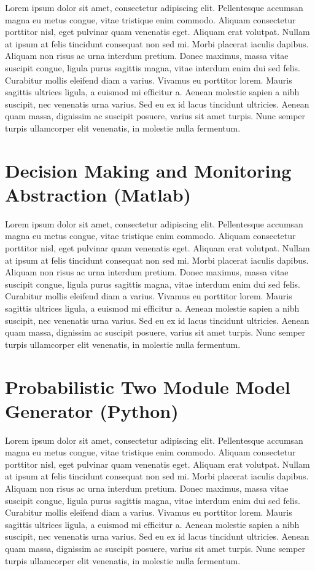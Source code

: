 Lorem ipsum dolor sit amet, consectetur adipiscing elit. Pellentesque accumsan magna eu metus congue, vitae tristique enim commodo. Aliquam consectetur porttitor nisl, eget pulvinar quam venenatis eget. Aliquam erat volutpat. Nullam at ipsum at felis tincidunt consequat non sed mi. Morbi placerat iaculis dapibus. Aliquam non risus ac urna interdum pretium. Donec maximus, massa vitae suscipit congue, ligula purus sagittis magna, vitae interdum enim dui sed felis. Curabitur mollis eleifend diam a varius. Vivamus eu porttitor lorem. Mauris sagittis ultrices ligula, a euismod mi efficitur a. Aenean molestie sapien a nibh suscipit, nec venenatis urna varius. Sed eu ex id lacus tincidunt ultricies. Aenean quam massa, dignissim ac suscipit posuere, varius sit amet turpis. Nunc semper turpis ullamcorper elit venenatis, in molestie nulla fermentum.

\section{Decision Making and Monitoring Abstraction (Matlab)}
\label{sec:dm_abs}

Lorem ipsum dolor sit amet, consectetur adipiscing elit. Pellentesque accumsan magna eu metus congue, vitae tristique enim commodo. Aliquam consectetur porttitor nisl, eget pulvinar quam venenatis eget. Aliquam erat volutpat. Nullam at ipsum at felis tincidunt consequat non sed mi. Morbi placerat iaculis dapibus. Aliquam non risus ac urna interdum pretium. Donec maximus, massa vitae suscipit congue, ligula purus sagittis magna, vitae interdum enim dui sed felis. Curabitur mollis eleifend diam a varius. Vivamus eu porttitor lorem. Mauris sagittis ultrices ligula, a euismod mi efficitur a. Aenean molestie sapien a nibh suscipit, nec venenatis urna varius. Sed eu ex id lacus tincidunt ultricies. Aenean quam massa, dignissim ac suscipit posuere, varius sit amet turpis. Nunc semper turpis ullamcorper elit venenatis, in molestie nulla fermentum.

\section{Probabilistic Two Module Model Generator (Python)}
\label{sec:two_module_gen}

Lorem ipsum dolor sit amet, consectetur adipiscing elit. Pellentesque accumsan magna eu metus congue, vitae tristique enim commodo. Aliquam consectetur porttitor nisl, eget pulvinar quam venenatis eget. Aliquam erat volutpat. Nullam at ipsum at felis tincidunt consequat non sed mi. Morbi placerat iaculis dapibus. Aliquam non risus ac urna interdum pretium. Donec maximus, massa vitae suscipit congue, ligula purus sagittis magna, vitae interdum enim dui sed felis. Curabitur mollis eleifend diam a varius. Vivamus eu porttitor lorem. Mauris sagittis ultrices ligula, a euismod mi efficitur a. Aenean molestie sapien a nibh suscipit, nec venenatis urna varius. Sed eu ex id lacus tincidunt ultricies. Aenean quam massa, dignissim ac suscipit posuere, varius sit amet turpis. Nunc semper turpis ullamcorper elit venenatis, in molestie nulla fermentum.

